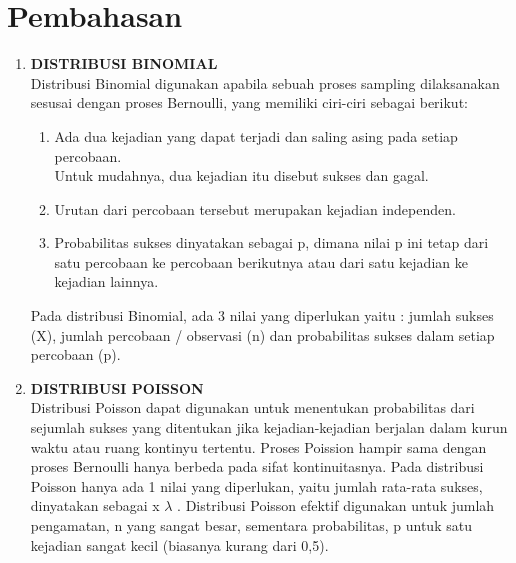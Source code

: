 \documentclass[a4paper,12pt]{article}
\begin{document}
\section{Pembahasan}
\begin{enumerate}[label=\textbf{\Alph*}.]
	\item \textbf{DISTRIBUSI BINOMIAL}\\
	Distribusi Binomial digunakan apabila sebuah proses sampling dilaksanakan
	sesusai dengan proses Bernoulli, yang memiliki ciri-ciri sebagai berikut:
	\begin{enumerate}
		\item Ada dua kejadian yang dapat terjadi dan saling asing pada setiap percobaan.\\ Untuk mudahnya, dua kejadian itu disebut sukses dan gagal.
		\item Urutan dari percobaan tersebut merupakan kejadian independen.
		\item Probabilitas sukses dinyatakan sebagai p, dimana nilai p ini tetap dari satu
		percobaan ke percobaan berikutnya atau dari satu kejadian ke kejadian
		lainnya.
	\end{enumerate}
	Pada distribusi Binomial, ada 3 nilai yang diperlukan yaitu : jumlah sukses (X),
	jumlah percobaan / observasi (n) dan probabilitas sukses dalam setiap percobaan (p).
	
	\item \textbf{DISTRIBUSI POISSON}\\
	Distribusi Poisson dapat digunakan untuk menentukan probabilitas dari sejumlah
	sukses yang ditentukan jika kejadian-kejadian berjalan dalam kurun waktu atau ruang
	kontinyu tertentu. Proses Poission hampir sama dengan proses Bernoulli hanya
	berbeda pada sifat kontinuitasnya. Pada distribusi Poisson hanya ada 1 nilai yang
	diperlukan, yaitu jumlah rata-rata sukses, dinyatakan sebagai x $\lambda$ . Distribusi Poisson
	efektif digunakan untuk jumlah pengamatan, n yang sangat besar, sementara
	probabilitas, p untuk satu kejadian sangat kecil (biasanya kurang dari 0,5).
\end{enumerate}

\newpage
\end{document}
